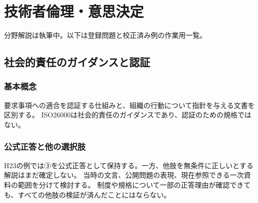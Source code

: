 \chapter{技術者倫理・意思決定}
\noindent 分野解説は執筆中。以下は登録問題と校正済み例の作業用一覧。
\section{社会的責任のガイダンスと認証}
\subsection{基本概念}
要求事項への適合を認証する仕組みと、組織の行動について指針を与える文書を区別する。
ISO26000は社会的責任のガイダンスであり、認証のための規格ではない\cite{iso26000}。
\subsection{公式正答と他の選択肢}
H23の例では③を公式正答として保持する。一方、他肢を無条件に正しいとする解説はまだ確定しない。
当時の文言、公開問題の表現、現在参照できる一次資料の範囲を分けて検討する。
制度や規格について一部の正答理由が確認できても、すべての他肢の検証が済んだことにはならない。


